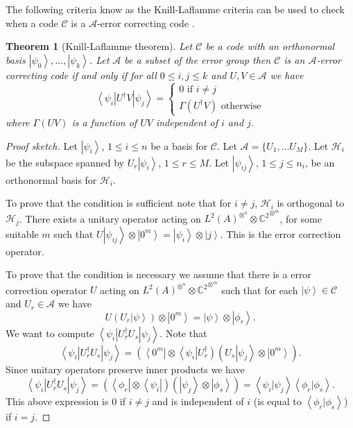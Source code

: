 \documentclass[11pt,twoside]{article}
\newtheorem{theorem}{Theorem}[section]
\theoremstyle{definition}
\theoremstyle{remark}
\newcommand{\ket}[1]{\ensuremath{\left\vert #1 \right\rangle}}
\newcommand{\bra}[1]{\ensuremath{\left\langle #1 \right\vert}}
\newcommand{\braket}[2]{\ensuremath{\left\langle #1 \vert #2 \right\rangle}}
\newcommand{\LN}[1]{\ensuremath{L^2\left(#1\right)^{\otimes^n}}}
\newcommand{\Qbit}[0]{{\ensuremath{\mathbb{C}^2}}}
\begin{document}
The following criteria know as the Knill-Laflamme criteria can be used
to check when a code $\mathcal{C}$ is a $\mathcal{A}$-error correcting
code \cite{knill2000theory}.

\begin{theorem}[Knill-Laflamme theorem]\label{thm-kl}
  Let $\mathcal{C}$ be a code with an orthonormal basis
  $\ket{\psi_0},\ldots,\ket{\psi_k}$. Let $\mathcal{A}$ be a subset of
  the error group then $\mathcal{C}$ is an $\mathcal{A}$-error
  correcting code if and only if for all $0 \leq i,j \leq k$ and $U,V
  \in \mathcal{A}$ we have
  \[
  \bra{\psi_i}U^\dag V \ket{\psi_j} = \left\{ \begin{array}{l}
      0 \textrm{ if } i \neq j \\
      \Gamma(U^\dag V) \textrm{ otherwise}
    \end{array}
  \right.
  \]
  where $\Gamma(UV)$ is a function of $UV$ independent of $i$
  and $j$.
\end{theorem}
\begin{proof}[Proof sketch]
  Let $\ket{\psi_i}$, $1 \leq i \leq n$ be a basis for $\mathcal{C}$.
  Let $\mathcal{A} = \{ U_1,\ldots U_M \}$. Let $\mathcal{H}_i$ be the
  subspace spanned by $U_r \ket{\psi_i}$, $1 \leq r \leq M$. Let
  $\ket{\psi_{ij}}$, $1 \leq j \leq n_i$, be an orthonormal basis for
  $\mathcal{H}_i$. 
  
  To prove that the condition is sufficient note that for $i \neq j$,
  $\mathcal{H}_i$ is orthogonal to $\mathcal{H}_j$.  There exists a
  unitary operator acting on $\LN{A} \otimes \Qbit^{\otimes^m}$, for
  some suitable $m$ such that $U \ket{\psi_{ij}} \otimes \ket{0^m} =
  \ket{\psi_i} \otimes \ket{j}$. This is the error correction
  operator.
  
  To prove that the condition is necessary we assume that there is a
  error correction operator $U$ acting on $\LN{A} \otimes
  \Qbit^{\otimes^m}$ such that for each $\ket{\psi} \in \mathcal{C}$
  and $U_r \in \mathcal{A}$ we have
  \[
  U (U_r \ket{\psi}) \otimes \ket{0^m} = \ket{\psi} \otimes
  \ket{\phi_r}.
  \]
  We want to compute $\bra{\psi_i}U_r^\dag U_s \ket{\psi_j}$. Note that
  \[
  \bra{\psi_i}U_r^\dag U_s \ket{\psi_j} = (\bra{0^m} \otimes
  \bra{\psi_i} U_r^\dag) (U_s \ket{\psi_j} \otimes \ket{0^m}).
  \]
  Since unitary operators preserve inner products we have
  \[
  \bra{\psi_i}U_r^\dag U_s \ket{\psi_j} = (\bra{\phi_r} \otimes
  \bra{\psi_i}) (\ket{\psi_j} \otimes \ket{\phi_s}) =
  \braket{\psi_i}{\psi_j} \braket{\phi_r}{\phi_s}.
  \]
  This above expression is $0$ if $i \neq j$ and is independent of $i$
  (is equal to $\braket{\phi_r}{\phi_s}$) if $i = j$.
\end{proof}
\end{document}
